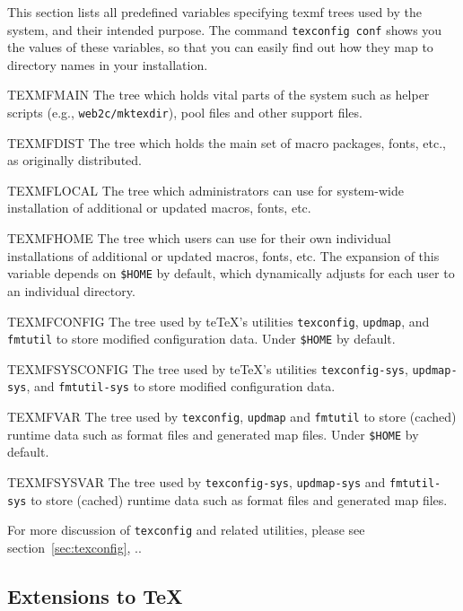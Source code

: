 \documentclass{article}
\begin{document}
This section lists all predefined variables specifying texmf trees used
by the system, and their intended purpose. The command \texttt{texconfig
conf} shows you the values of these variables, so that you can easily
find out how they map to directory names in your installation.

\begin{ttdescription}
\item [TEXMFMAIN] The tree which holds vital parts of the system 
  such as helper scripts (e.g., \verb+web2c/mktexdir+), pool files and
  other support files.
\item [TEXMFDIST] The tree which holds the main set of macro packages,
  fonts, etc., as originally distributed. 
\item [TEXMFLOCAL] The tree which administrators can use for system-wide
  installation of additional or updated macros, fonts, etc.
\item [TEXMFHOME] The tree which users can use for their own individual
  installations of additional or updated macros, fonts, etc.
  The expansion of this variable depends on \verb+$HOME+ by default, %
  which dynamically adjusts for each user to an individual
  directory. 
\item [TEXMFCONFIG] The tree used by te\TeX's utilities
  \verb+texconfig+, \verb+updmap+, and \verb+fmtutil+ to store modified
  configuration data.  Under \verb+$HOME+ by default. %
\item [TEXMFSYSCONFIG] The tree used by te\TeX's utilities
  \verb+texconfig-sys+, \verb+updmap-sys+, and \verb+fmtutil-sys+ to
  store modified configuration data.
\item [TEXMFVAR] The tree used by \verb+texconfig+, \verb+updmap+ and
  \verb+fmtutil+ to store (cached) runtime data such as format files and
  generated map files.  Under \verb+$HOME+ by default. %
\item [TEXMFSYSVAR] The tree used by \verb+texconfig-sys+,
  \verb+updmap-sys+ and \verb+fmtutil-sys+ to store (cached) runtime
  data such as format files and generated map files.
\end{ttdescription}

For more discussion of \texttt{texconfig} and related utilities, please
see section~\ref{sec:texconfig}, \p.\pageref{sec:texconfig}.


\subsection{Extensions to \protect\TeX}
\label{sec:tex-extensions}
\end{document}
